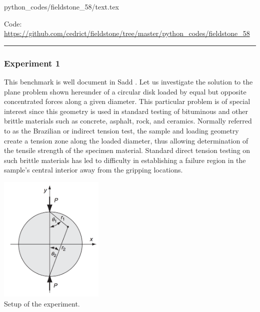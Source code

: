 
\begin{flushright} {\tiny {\color{gray} python\_codes/fieldstone\_58/text.tex}} \end{flushright}



\begin{center}
Code: \url{https://github.com/cedrict/fieldstone/tree/master/python_codes/fieldstone_58}
\end{center}

\par\noindent\rule{\textwidth}{0.4pt}



\subsubsection*{Experiment 1}

This benchmark is well document in Sadd \cite{sadd14}.
Let us investigate the solution to the plane problem shown hereunder of a circular disk 
loaded by equal but opposite concentrated forces along a given diameter. 
This particular problem is of special interest since this geometry is used 
in standard testing of bituminous and other brittle materials such as 
concrete, asphalt, rock, and ceramics. Normally referred to as the Brazilian or indirect tension test, 
the sample and loading geometry create a tension zone along the loaded diameter, 
thus allowing determination of the tensile strength of the specimen material. 
Standard direct tension testing on such brittle materials has led to difficulty 
in establishing a failure region in the sample’s central interior away from 
the gripping locations.

\begin{center}
\includegraphics[width=5cm]{python_codes/fieldstone_58/experiment1/setup}\\
{\captionfont Setup of the experiment.}
\end{center}

